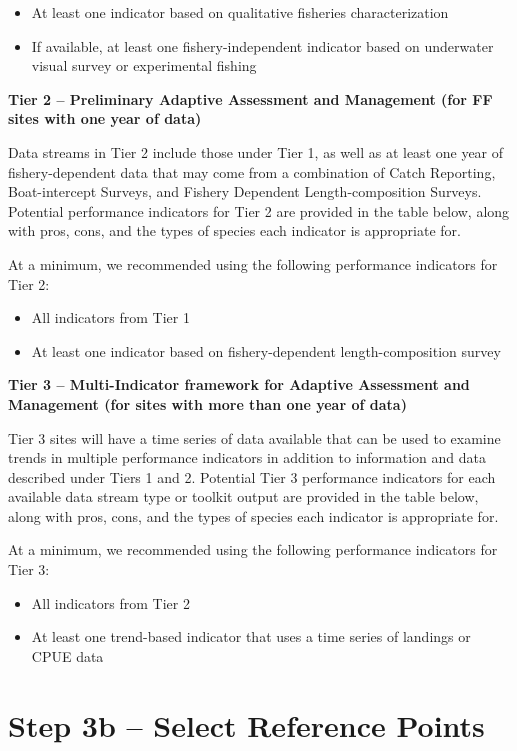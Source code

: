 \documentclass[]{book}
\begin{document}
\begin{itemize}
\item
  At least one indicator based on qualitative fisheries characterization
\item
  If available, at least one fishery-independent indicator based on
  underwater visual survey or experimental fishing
\end{itemize}

\textbf{Tier 2 -- Preliminary Adaptive Assessment and Management (for FF
sites with one year of data)}

Data streams in Tier 2 include those under Tier 1, as well as at least
one year of fishery-dependent data that may come from a combination of
Catch Reporting, Boat-intercept Surveys, and Fishery Dependent
Length-composition Surveys. Potential performance indicators for Tier 2
are provided in the table below, along with pros, cons, and the types of
species each indicator is appropriate for.

At a minimum, we recommended using the following performance indicators
for Tier 2:

\begin{itemize}
\item
  All indicators from Tier 1
\item
  At least one indicator based on fishery-dependent length-composition
  survey
\end{itemize}

\textbf{Tier 3 -- Multi-Indicator framework for Adaptive Assessment and
Management (for sites with more than one year of data)}

Tier 3 sites will have a time series of data available that can be used
to examine trends in multiple performance indicators in addition to
information and data described under Tiers 1 and 2. Potential Tier 3
performance indicators for each available data stream type or toolkit
output are provided in the table below, along with pros, cons, and the
types of species each indicator is appropriate for.

At a minimum, we recommended using the following performance indicators
for Tier 3:

\begin{itemize}
\item
  All indicators from Tier 2
\item
  At least one trend-based indicator that uses a time series of landings
  or CPUE data
\end{itemize}

\section{Step 3b -- Select Reference
Points}\label{step-3b-select-reference-points}
\end{document}
